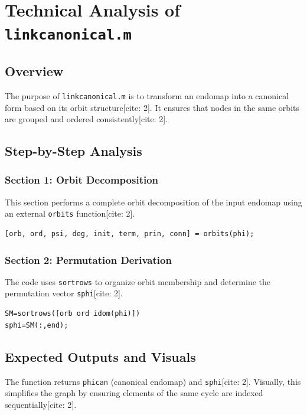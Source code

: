 
\chapter{Technical Analysis of \texttt{linkcanonical.m}}
\date{March 10, 2026}

\maketitle

\section{Overview}
The purpose of \texttt{linkcanonical.m} is to transform an endomap into a canonical form based on its orbit structure[cite: 2]. It ensures that nodes in the same orbits are grouped and ordered consistently[cite: 2].

\section{Step-by-Step Analysis}

\subsection{Section 1: Orbit Decomposition}
This section performs a complete orbit decomposition of the input endomap using an external \texttt{orbits} function[cite: 2].
\begin{lstlisting}
[orb, ord, psi, deg, init, term, prin, conn] = orbits(phi);
\end{lstlisting}

\subsection{Section 2: Permutation Derivation}
The code uses \texttt{sortrows} to organize orbit membership and determine the permutation vector \texttt{sphi}[cite: 2].
\begin{lstlisting}
SM=sortrows([orb ord idom(phi)])
sphi=SM(:,end); 
\end{lstlisting}

\section{Expected Outputs and Visuals}
The function returns \texttt{phican} (canonical endomap) and \texttt{sphi}[cite: 2]. Visually, this simplifies the graph by ensuring elements of the same cycle are indexed sequentially[cite: 2].
